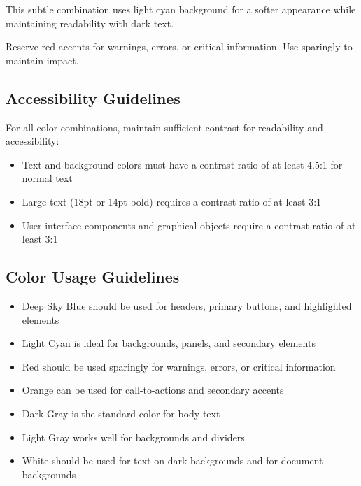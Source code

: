\documentclass[11pt]{article}
\newcommand{\colorcombination}[5]{%
\begin{tcolorbox}[
  colback=#1,
  colframe=#2,
  coltext=#3,
  title={\textbf{#4}},
  title colback=#2,
  title colframe=#2,
  title coltext=white,
  width=0.95\linewidth,
  arc=2mm,
  boxrule=0.5pt
]
#5
\end{tcolorbox}
}
\begin{document}
\begin{multicols}{2}
\colorcombination{CDOSRSecondary!30}{CDOSRPrimary}{CDOSRText}{Secondary - Subtle}{
    This subtle combination uses light cyan background for a softer appearance while maintaining readability with dark text.
}

\columnbreak

\colorcombination{CDOSRWhite}{CDOSRAccent}{CDOSRText}{Accent - Warning}{
    Reserve red accents for warnings, errors, or critical information. Use sparingly to maintain impact.
}
\end{multicols}

\subsection{Accessibility Guidelines}

For all color combinations, maintain sufficient contrast for readability and accessibility:

\begin{itemize}[leftmargin=1cm, itemindent=0.25cm, noitemsep, topsep=0pt, label=$\bullet$]
    \item Text and background colors must have a contrast ratio of at least 4.5:1 for normal text
    \item Large text (18pt or 14pt bold) requires a contrast ratio of at least 3:1
    \item User interface components and graphical objects require a contrast ratio of at least 3:1
\end{itemize}

\subsection{Color Usage Guidelines}

\begin{itemize}[leftmargin=1cm, itemindent=0.25cm, noitemsep, topsep=0pt, label=$\bullet$]
    \item Deep Sky Blue should be used for headers, primary buttons, and highlighted elements
    \item Light Cyan is ideal for backgrounds, panels, and secondary elements
    \item Red should be used sparingly for warnings, errors, or critical information
    \item Orange can be used for call-to-actions and secondary accents
    \item Dark Gray is the standard color for body text
    \item Light Gray works well for backgrounds and dividers
    \item White should be used for text on dark backgrounds and for document backgrounds
\end{itemize}
\end{document}
